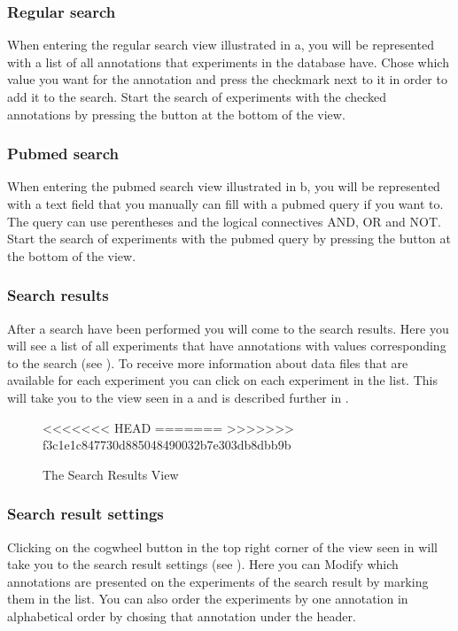 \subsubsection{Regular search}
When entering the regular search view illustrated in a, you will be represented with a list of all
annotations that experiments in the database have. Chose which value you want for the annotation and press the checkmark next to it in order to add it to the search. Start the search of experiments with the checked annotations by pressing the  button at the bottom of the view.

\subsubsection{Pubmed search}
When entering the pubmed search view illustrated in b, you will be represented with a text field that you manually can fill with a pubmed query if you want to. The query can use perentheses and the logical connectives AND, OR and NOT. Start the search of experiments with the pubmed query by pressing the  button at the bottom of the view.


\subsubsection{Search results}
After a search have been performed you will come to the search results. Here you will see a list of all experiments that have
annotations with values corresponding to the search (see ). To receive more information about data files that are available for each experiment you can click on each experiment in the list. This will take you to the view seen in a and is described further in .

\begin{figure}[h]
<<<<<<< HEAD
=======
>>>>>>> f3c1e1c847730d885048490032b7e303db8dbb9b
\caption{The Search Results View}
\label{fig:and_search_results_man} 
\end{figure}
\FloatBarrier


\subsubsection{Search result settings}\label{sec:search_settings}
Clicking on the cogwheel button in the top right corner of the view seen in  will take you to the search result settings (see ). Here you can Modify which annotations are presented on the experiments of the search result by marking them in the list. You can also order the experiments by one annotation in alphabetical order by chosing that annotation under the  header.

